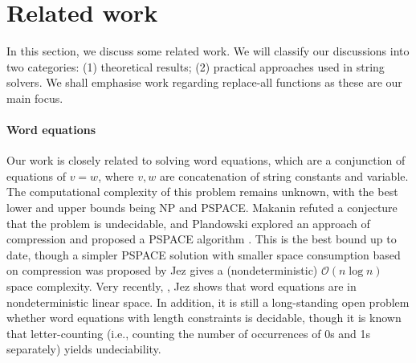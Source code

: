 
\section{Related work}

 
In this section, we discuss some related work. We will classify our discussions into two categories: (1) theoretical results; (2) practical approaches used in string solvers.  We shall emphasise work regarding replace-all functions as these are our main focus. 

\paragraph{Word equations} Our work is closely related to solving word equations, which are a conjunction of equations of $v=w$, where $v, w$ are concatenation of string constants and variable. The computational complexity of this problem remains unknown, with the best lower and upper bounds being NP and PSPACE. Makanin refuted a conjecture that the problem is undecidable, and %
Plandowski explored an approach of compression and proposed a PSPACE algorithm \cite{P04}.  This is the best bound up to date, though a simpler PSPACE solution with smaller space consumption based on compression was proposed by Jez \cite{J16}  gives a (nondeterministic) $\mathcal{O}(n \log n)$ space complexity. Very recently, \cite{J17}, Jez shows that word equations are in nondeterministic linear space. 
In addition, it is still a long-standing open problem whether word equations with length constraints is decidable, though it is known that letter-counting (i.e., counting the number of occurrences of 0s and 1s separately) yields undeciability.  





